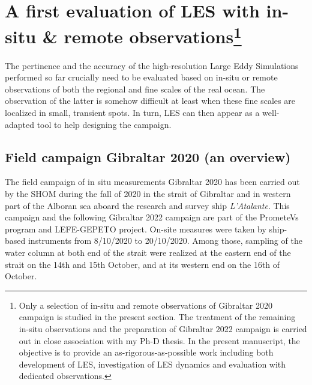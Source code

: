 \hypersetup{pdfborder=0 0 0}


\section[A first evaluation of LES with in-situ \& remote observations]{A first evaluation of LES with in-situ \& remote observations\footnote{Only a selection of in-situ and remote observations of Gibraltar 2020 campaign is studied in the present section. The treatment of the remaining in-situ observations and the preparation of Gibraltar 2022 campaign is carried out in close association with my Ph-D thesis. In the present manuscript, the objective is to provide an as-rigorous-as-possible work including both development of LES, investigation of LES dynamics and evaluation with dedicated observations.}}
\label{sectionCampagne}

\color{blue}The pertinence and the accuracy of the high-resolution Large Eddy Simulations performed so far crucially need to be evaluated based on in-situ or remote observations of both the regional and fine scales of the real ocean. The observation of the latter is somehow difficult at least when these fine scales are localized in small, transient spots. In turn, LES can then appear as a well-adapted tool to help designing the campaign.\color{black}

\subsection{Field campaign Gibraltar 2020 (an overview)}
The field campaign of in situ measurements Gibraltar 2020 has been carried out by the SHOM \color{blue} during the fall of 2020 \color{black} in the strait of Gibraltar and in western part of the Alboran sea aboard the research and survey ship \textit{L'Atalante}. \color{blue} This campaign and the following Gibraltar 2022 campaign are part of the PrometeVs program and LEFE-GEPETO project\color{black}. On-site measures were taken by ship-based instruments from 8/10/2020 to 20/10/2020. Among those, sampling of the water column at both end of the strait were realized at the eastern end of the strait on the 14th and 15th October, and at its western end on the 16th of October.

